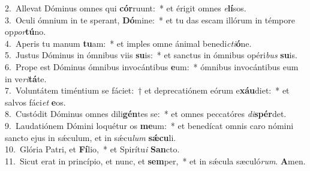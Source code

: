 {2.~}Allevat Dóminus omnes qui \textbf{cór}ruunt:~* et érigit omnes \textit{e}\textbf{lí}sos.\\
{3.~}Oculi ómnium in te sperant, \textbf{Dó}mine:~* et tu das escam illórum in témpore op\textit{por}\textbf{tú}no.\\
{4.~}Aperis tu manum \textbf{tu}am:~* et imples omne ánimal benedi\textit{cti}\textbf{ó}ne.\\
{5.~}Justus Dóminus in ómnibus viis \textbf{su}is:~* et sanctus in ómnibus opéri\textit{bus} \textbf{su}is.\\
{6.~}Prope est Dóminus ómnibus invocántibus \textbf{e}um:~* ómnibus invocántibus eum in ve\textit{ri}\textbf{tá}te.\\
{7.~}Voluntátem timéntium se fáciet:~† et deprecatiónem eórum e\textbf{xáu}diet:~* et salvos fáci\textit{et} \textbf{e}os.\\
{8.~}Custódit Dóminus omnes dili\textbf{gén}tes se:~* et omnes peccatóres \textit{di}\textbf{spér}det.\\
{9.~}Laudatiónem Dómini loquétur os \textbf{me}um:~* et benedícat omnis caro nómini sancto ejus in sǽculum, et in sǽcu\textit{lum} \textbf{sǽ}\textbf{cu}li.\\
{10.~}Glória Patri, et \textbf{Fí}lio,~* et Spirítu\textit{i} \textbf{San}cto.\\
{11.~}Sicut erat in princípio, et nunc, et \textbf{sem}per,~* et in sǽcula sæculó\textit{rum}. \textbf{A}men.\\
